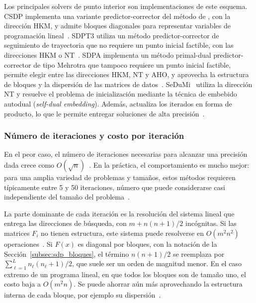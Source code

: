 Los principales solvers de punto interior son implementaciones de este esquema. CSDP implementa
una variante predictor-corrector del método de \textcite{helmbergInteriorPointMethodSemidefinite1996}
\parencite{borchersCSDPLibrarySemidefinite1999}, con la dirección HKM, y admite bloques diagonales
para representar variables de programación lineal~\parencite[p.~412]{mittelmannIndependentBenchmarkingSDP2003a}.
SDPT3 utiliza un método predictor-corrector de seguimiento de trayectoria que no requiere un punto
inicial factible, con las direcciones HKM o NT~\parencite{tohImplementationUsageSDPT32012a}.
SDPA implementa un método primal-dual predictor-corrector de tipo Mehrotra que tampoco requiere un
punto inicial factible, permite elegir entre las direcciones HKM, NT y AHO, y aprovecha la
estructura de bloques y la dispersión de las matrices de
datos~\parencite[p.~411]{mittelmannIndependentBenchmarkingSDP2003a}. SeDuMi~\parencite{sturmUSINGSEDUMI1022001}
utiliza la dirección NT y resuelve el problema de inicialización mediante la técnica de
embebido autodual (\textit{self-dual embedding}). Además, actualiza los iterados en forma
de producto, lo que le permite entregar soluciones de alta
precisión~\parencite[pp.~411--412 y 421]{mittelmannIndependentBenchmarkingSDP2003a}.

\subsubsection*{Número de iteraciones y costo por iteración}

En el peor caso, el número de iteraciones necesarias para alcanzar una precisión dada crece como
$O(\sqrt{n})$~\parencite[p.~84]{vandenbergheSemidefiniteProgramming1996}. En la práctica, el
comportamiento es mucho mejor: para una amplia variedad de problemas y tamaños, estos métodos
requieren típicamente entre 5 y 50 iteraciones, número que puede considerarse casi independiente
del tamaño del problema~\parencite[pp.~84 y 91]{vandenbergheSemidefiniteProgramming1996}.

La parte dominante de cada iteración es la resolución del sistema
lineal que entrega las direcciones de búsqueda, con $m + n(n+1)/2$ incógnitas. Si las matrices
$F_i$ no tienen estructura, este sistema puede resolverse en $O(m^2 n^2)$
operaciones~\parencite[pp.~77 y 89]{vandenbergheSemidefiniteProgramming1996}. Si $F(x)$ es diagonal por bloques,
con la notación de la Sección~\ref{subsec:sdp_bloques}, el término $n(n+1)/2$ se reemplaza por
$\sum_{\ell=1}^{L} n_\ell(n_\ell+1)/2$, que suele ser un orden de magnitud menor. En el caso
extremo de un programa lineal, en que todos los bloques son de tamaño uno, el costo baja a
$O(m^2 n)$. Se puede ahorrar aún más aprovechando la estructura interna de cada bloque, por
ejemplo su dispersión~\parencite[p.~89]{vandenbergheSemidefiniteProgramming1996}.

